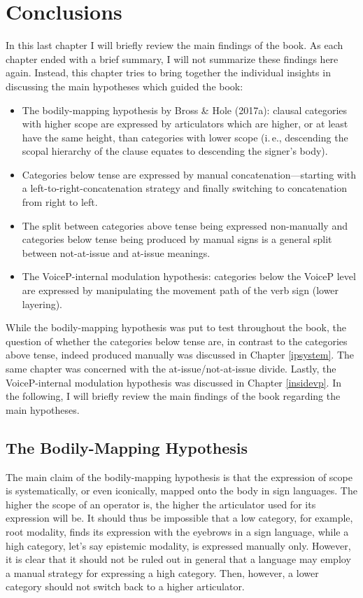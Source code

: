 \chapter{Conclusions}\label{chapterconclusions}
In this last chapter I will briefly review the main findings of the book. As each chapter ended with a brief summary, I will not summarize these findings here again. Instead, this chapter tries to bring together the individual insights in discussing the main hypotheses which guided the book:


\begin{itemize}[itemsep=0pt]
	\item The bodily-mapping hypothesis by Bross \& Hole (2017a): clausal categories with higher scope are expressed by articulators which are higher, or at least have the same height, than categories with lower scope (i.\,e., descending the scopal hierarchy of the clause equates to descending the signer's body).
	\item Categories below tense are expressed by manual concatenation---starting with a left-to-right-concatenation strategy and finally switching to concatenation from right to left.
	\item The split between categories above tense being expressed non-manually and categories below tense being produced by manual signs is a general split between not-at-issue and at-issue meanings.
	\item The VoiceP-internal modulation hypothesis: categories below the VoiceP level are expressed by manipulating the movement path of the verb sign (lower layering).
\end{itemize}

\noindent While the bodily-mapping hypothesis was put to test throughout the book, the question of whether the categories below tense are, in contrast to the categories above tense, indeed produced manually was discussed in Chapter \ref{ipsystem}. The same chapter was concerned with the at-issue/not-at-issue divide. Lastly, the VoiceP-internal modulation hypothesis was discussed in Chapter \ref{insidevp}. In the following, I will briefly review the main findings of the book regarding the main hypotheses.

\section{The Bodily-Mapping Hypothesis}
The main claim of the bodily-mapping hypothesis is that the expression of scope is systematically, or even iconically, mapped onto the body in sign languages. The higher the scope of an operator is, the higher the articulator used for its expression will be. It should thus be impossible that a low category, for example, root modality, finds its expression with the eyebrows in a sign language, while a high category, let's say epistemic modality, is expressed manually only. However, it is clear that it should not be ruled out in general that a language may employ a manual strategy for expressing a high category. Then, however, a lower category should not switch back to a higher articulator. 

